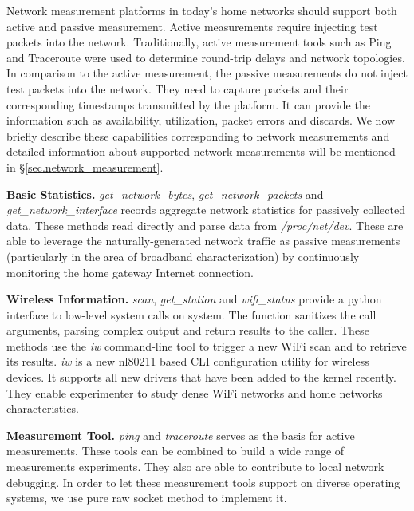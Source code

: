 Network measurement platforms in today's home networks should support both active and passive measurement. Active measurements require injecting test packets into the network. Traditionally, active measurement tools such as Ping\cite{ping} and Traceroute\cite{traceroute} were used to determine round-trip delays and network topologies. In comparison to the active measurement, the passive measurements do not inject test packets into the network. They need to capture packets and their corresponding timestamps transmitted by the platform. It can provide the information such as availability, utilization, packet errors and discards\cite{calyamactive}. We now briefly describe these capabilities corresponding to network measurements and detailed information about supported network measurements will be mentioned in \S{\ref{sec.network_measurement}}.

\textbf{Basic Statistics.} \textit{get\_network\_bytes}, \textit{get\_network\_packets} and \textit{get\_network\_interface} records aggregate network statistics for passively collected data. These methods read directly and parse data from \emph{/proc/net/dev}. These are able to leverage the naturally-generated network traffic as passive measurements (particularly in the area of broadband characterization) by continuously monitoring the home gateway Internet connection.

\textbf{Wireless Information.} \textit{scan}, \textit{get\_station} and \textit{wifi\_status} provide a python interface to low-level system calls on system. The function sanitizes the call arguments, parsing complex output and return results to the caller. These methods use the \emph{iw} command-line tool to trigger a new WiFi scan and to retrieve its results. \emph{iw} is a new nl80211 based CLI configuration utility for wireless devices. It supports all new drivers that have been added to the kernel recently\cite{iw}. They enable experimenter to study dense WiFi networks and home networks characteristics.

\textbf{Measurement Tool.} \textit{ping} and \textit{traceroute} serves as the basis for active measurements. These tools can be combined to build a wide range of measurements experiments. They also are able to contribute to local network debugging. In order to let these measurement tools support on diverse operating systems, we use pure raw socket method to implement it. 



